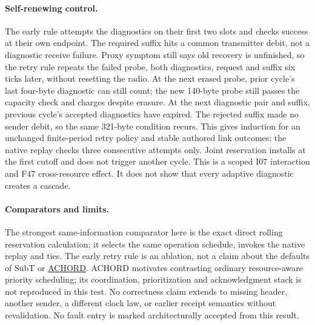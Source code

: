 \documentclass{article}
\begin{document}
\paragraph{Self-renewing control.}
The early rule attempts the diagnostics on their first two slots and checks success at their own endpoint. The required suffix hits a common transmitter debit, not a diagnostic receive failure. Proxy symptom still says old recovery is unfinished, so the retry rule repeats the failed probe, both diagnostics, request and suffix six ticks later, without resetting the radio. At the next erased probe, prior cycle's last four-byte diagnostic can still count; the new 140-byte probe still passes the capacity check and charges despite erasure. At the next diagnostic pair and suffix, previous cycle's accepted diagnostics have expired. The rejected suffix made no sender debit, so the same 321-byte condition recurs. This gives induction for an unchanged finite-period retry policy and stable authored link outcomes; the native replay checks three consecutive attempts only. Joint reservation installs at the first cutoff and does not trigger another cycle. This is a scoped I07 interaction and F47 cross-resource effect. It does not show that every adaptive diagnostic creates a cascade.

\paragraph{Comparators and limits.}
The strongest same-information comparator here is the exact direct rolling reservation calculation; it selects the same operation schedule, invokes the native replay and ties. The early retry rule is an ablation, not a claim about the defaults of SubT or \href{https://arxiv.org/abs/2206.02245}{ACHORD}. ACHORD motivates contrasting ordinary resource-aware priority scheduling; its coordination, prioritization and acknowledgment stack is not reproduced in this test. No correctness claim extends to missing header, another sender, a different clock law, or earlier receipt semantics without revalidation. No fault entry is marked architecturally accepted from this result.
\end{document}
